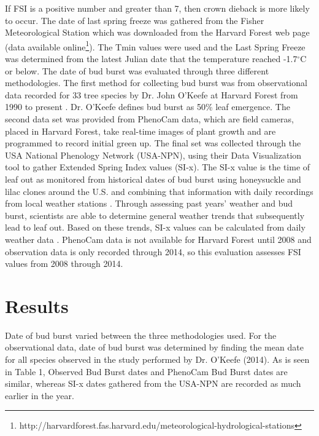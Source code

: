\documentclass{article}\usepackage[]{graphicx}\usepackage[]{color}
\begin{document}
If FSI is a positive number and greater than 7, then crown dieback is more likely to occur. The date of last spring freeze was gathered from the Fisher Meteorological Station which was downloaded from the Harvard Forest web page (data available online\footnote{http://harvardforest.fas.harvard.edu/meteorological-hydrological-stations}). The Tmin values were used and the Last Spring Freeze was  determined from the latest Julian date that the temperature reached -1.7$^{\circ}$C or below. The date of bud burst was evaluated through three different methodologies. The first method for collecting bud burst was from observational data recorded for 33 tree species by Dr. John O'Keefe at Harvard Forest from 1990 to present \cite{OKeefe2014}. Dr. O'Keefe defines bud burst as 50\% leaf emergence. The second data set was provided from PhenoCam data, which are field cameras, placed in Harvard Forest, take real-time images of plant growth and are programmed to record initial green up. The final set was collected through the USA National Phenology Network (USA-NPN), using their Data Visualization tool to gather Extended Spring Index values (SI-x). The SI-x value is the time of leaf out as monitored from historical dates of bud burst using honeysuckle and lilac clones around the U.S. and combining that information with daily recordings from local weather stations \cite{USA-NPN2016, Ault2015, Ault2015a, Schwartz2013, Schwartz1997}. Through assessing past years' weather and bud burst, scientists are able to determine general weather trends that subsequently lead to leaf out. Based on these trends, SI-x values can be calculated from daily weather data \cite{USA-NPN2016}. %
\newline
PhenoCam data is not available for Harvard Forest until 2008 and observation data is only recorded through 2014, so this evaluation assesses FSI values from 2008 through 2014. 
\section*{Results}
Date of bud burst varied between the three methodologies used. For the observational data, date of bud burst was determined by finding the mean date for all species observed in the study performed by Dr. O'Keefe (2014). %
As is seen in Table 1, Observed Bud Burst dates and PhenoCam Bud Burst dates are similar, whereas SI-x dates gathered from the USA-NPN are recorded as much earlier in the year.
\end{document}
